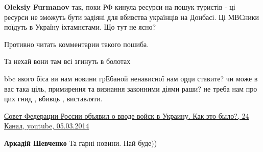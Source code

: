 \begin{itemize}
\begin{itemize}
 
\textbf{Oleksiy Furmanov} так, поки РФ кинула ресурси на пошук туристів - ці ресурси не зможуть бути задіяні для вбивства українців на Донбасі.
Ці МВСники поїдуть в Україну іхтамнєтами.
Що тут не ясно?
\end{itemize}

 
Противно читать комментарии такого пошиба.

 
Та нехай вони там всі згинуть в болотах

 

bbc якого біса ви нам новини грЕбаной ненависної нам орди ставите? чи може в
вас така ціль, примирення та визнання законними діями раши? не треба нам про
цих гнид , вбивць , виставляти.

\href{https://www.youtube.com/watch?app=desktop&v=Mmep0Y7YiC4}{%
Совет Федерации России объявил о вводе войск в Украину. Как это было?, 24 Канал, youtube, 05.03.2014%
}

\begin{itemize}
 
\textbf{Аркадій Шевченко} Та гарні новини. Най буде))


\end{itemize}
\end{itemize}
